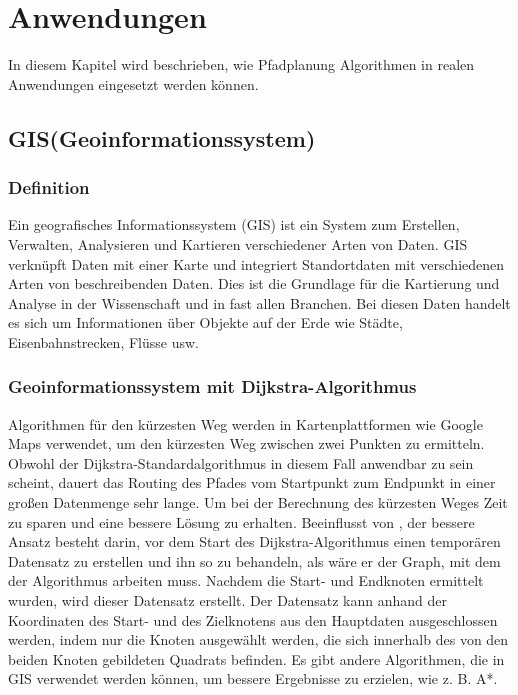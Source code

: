 \chapter{Anwendungen}
\label{Anwendungen}

In diesem Kapitel wird beschrieben, wie Pfadplanung Algorithmen in realen Anwendungen eingesetzt werden können.
\section{GIS(Geoinformationssystem)}
\label{GIS(Geoinformationssystem)}
\subsection{Definition}

Ein geografisches Informationssystem (GIS) ist ein System zum Erstellen, Verwalten, Analysieren und Kartieren verschiedener Arten von Daten. GIS verknüpft Daten mit einer Karte und integriert Standortdaten mit verschiedenen Arten von beschreibenden Daten. Dies ist die Grundlage für die Kartierung und Analyse in der Wissenschaft und in fast allen Branchen.
Bei diesen Daten handelt es sich um Informationen über Objekte auf der Erde wie Städte, Eisenbahnstrecken, Flüsse usw\cite{Vaibhavi2014}. 

\subsection{Geoinformationssystem mit Dijkstra-Algorithmus}
Algorithmen für den kürzesten Weg werden in Kartenplattformen wie Google Maps verwendet, um den kürzesten Weg zwischen zwei Punkten zu ermitteln.
Obwohl der Dijkstra-Standardalgorithmus in diesem Fall anwendbar zu sein scheint, dauert das Routing des Pfades vom Startpunkt zum Endpunkt in einer großen Datenmenge sehr lange\cite{HamidAli2020}.
\newline
\newline
 Um bei der Berechnung des kürzesten Weges Zeit zu sparen und eine bessere Lösung zu erhalten. Beeinflusst von \cite{HamidAli2020}, der bessere Ansatz besteht darin, vor dem Start des Dijkstra-Algorithmus einen temporären Datensatz zu erstellen und ihn so zu behandeln, als wäre er der Graph, mit dem der Algorithmus arbeiten muss. 
 Nachdem die Start- und Endknoten ermittelt wurden, wird dieser Datensatz erstellt. Der Datensatz kann anhand der Koordinaten des Start- und des Zielknotens aus den Hauptdaten ausgeschlossen werden, indem nur die Knoten ausgewählt werden, die sich innerhalb des von den beiden Knoten gebildeten Quadrats befinden.
 Es gibt andere Algorithmen, die in GIS verwendet werden können, um bessere Ergebnisse zu erzielen, wie z. B. A*.



